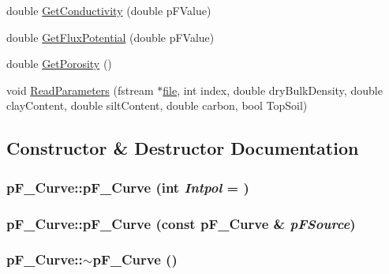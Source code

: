 \begin{DoxyCompactItemize}
double \hyperlink{classp_f___curve_ad91243e8ef9217ea0979deac6dffa268}{GetConductivity} (double pFValue)
\item 
double \hyperlink{classp_f___curve_a8a960e306ab5f6285102c50e3de04b65}{GetFluxPotential} (double pFValue)
\item 
double \hyperlink{classp_f___curve_a56e32b11b9053c1b91ac9610c38a3822}{GetPorosity} ()
\item 
void \hyperlink{classp_f___curve_a32cae6290138a8f729593ed623b03af5}{ReadParameters} (fstream $\ast$\hyperlink{classbase_a3af52ee9891719d09b8b19b42450b6f6}{file}, int index, double dryBulkDensity, double clayContent, double siltContent, double carbon, bool TopSoil)
\end{DoxyCompactItemize}


\subsection{Constructor \& Destructor Documentation}
\hypertarget{classp_f___curve_a08f8e5a9dbf7d29e0413501fa695a8bf}{
\subsubsection[{pF\_\-Curve}]{\setlength{\rightskip}{0pt plus 5cm}pF\_\-Curve::pF\_\-Curve (int {\em Intpol} = {})}}
\label{classp_f___curve_a08f8e5a9dbf7d29e0413501fa695a8bf}
\hypertarget{classp_f___curve_a563d797aa0fddb481ae44b8dffcc4283}{
\subsubsection[{pF\_\-Curve}]{\setlength{\rightskip}{0pt plus 5cm}pF\_\-Curve::pF\_\-Curve (const {\bf pF\_\-Curve} \& {\em pFSource})}}
\label{classp_f___curve_a563d797aa0fddb481ae44b8dffcc4283}
\hypertarget{classp_f___curve_a9a3addfa27190e8e5d00659ed79dc942}{
\subsubsection[{$\sim$pF\_\-Curve}]{\setlength{\rightskip}{0pt plus 5cm}pF\_\-Curve::$\sim$pF\_\-Curve ()}}
\label{classp_f___curve_a9a3addfa27190e8e5d00659ed79dc942}


